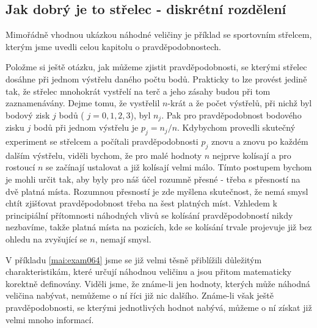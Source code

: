     \subsection{Jak dobrý je to střelec - diskrétní rozdělení}
      Mimořádně vhodnou ukázkou náhodné veličiny je příklad se sportovním střelcem, kterým jsme
      uvedli celou kapitolu o pravděpodobnostech.
  
      
    
    Položme si ještě otázku, jak můžeme zjistit pravděpodobnosti, se kterými střelec dosáhne při
    jednom výstřelu daného počtu bodů. Prakticky to lze provést jedině tak, že střelec mnohokrát
    vystřelí na terč a jeho zásahy budou při tom zaznamenávány. Dejme tomu, že vystřelil \(n\)-krát 
    a že počet výstřelů, při nichž byl bodový zisk \(j\) bodů ( \(j = 0, 1, 2, 3\)), byl \(n_j\). 
    Pak pro pravděpodobnost bodového zisku \(j\) bodů při jednom výstřelu je \(p_j = n_j/n\). 
    Kdybychom provedli skutečný experiment se střelcem a počítali pravděpodobnosti \(p_j\) znovu a 
    znovu po každém dalším výstřelu, viděli bychom, že pro malé hodnoty \(n\) nejprve kolísají a 
    pro rostoucí \(n\) se začínají ustalovat a již kolísají velmi málo. Tímto postupem bychom je 
    mohli určit tak, aby byly pro náš účel rozumně přesné - třeba s přesností na dvě platná místa. 
    Rozumnou přesností je zde myšlena skutečnost, že nemá smysl chtít zjišťovat pravděpodobnost 
    třeba na šest platných míst. Vzhledem k principiální přítomnosti náhodných vlivů se kolísání 
    pravděpodobností nikdy nezbavíme, takže platná místa na pozicích, kde se kolísání trvale 
    projevuje již bez ohledu na zvyšující se \(n\), nemají smysl.
    
    V příkladu \ref{mai:exam064} jsme se již velmi těsně přiblížili důležitým charakteristikám, 
    které určují náhodnou veličinu a jsou přitom matematicky korektně definovány. Viděli jsme, že 
    známe-li jen hodnoty, kterých může náhodná veličina nabývat, nemůžeme o ní říci již nic 
    dalšího. Známe-li však ještě pravděpodobnosti, se kterými jednotlivých hodnot nabývá, můžeme o 
    ní získat již velmi mnoho informací.


